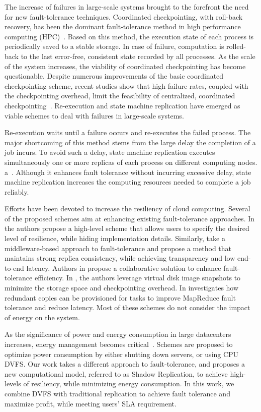 
\noindent 
The increase of failures in large-scale systems 
brought to the forefront the need for new fault-tolerance techniques. 
Coordinated checkpointing, with roll-back recovery, has been the dominant
fault-tolerance method in high performance computing (HPC)~\cite{Agarwal04adaptiveincremental,781058,Daly2006303,632814}. 
Based on this method, the execution state of each process is 
periodically saved to a stable storage. In case of failure, computation is 
rolled-back to the last error-free, consistent state recorded by all processes. 
As the scale of the system increases, the viability of coordinated checkpointing has become questionable. 
Despite numerous improvements of the basic coordinated checkpointing scheme, 
recent studies show that high failure rates, coupled with the checkpointing
overhead, limit the feasibility of 
centralized, coordinated checkpointing~\cite{Diouri2012}. 
Re-execution and state machine replication have emerged 
as viable schemes to deal with failures in large-scale systems. 

Re-execution waits until a failure occurs and re-executes the failed process. 
The major shortcoming of this method stems from the large 
delay the completion of a job incurs. To avoid such a delay, state machine replication executes simultaneously one or more replicas of each process on different computing nodes.
a~\cite{Ferreira2011,Sousa2005}. Although it enhances fault tolerance without incurring excessive delay,
state machine replication increases the
computing resources needed to complete a job reliably. 

Efforts have been devoted to increase the resiliency of cloud computing. Several of the proposed schemes aim at
enhancing existing fault-tolerance approaches.  In \cite{jhawar_systems_2013} the authors propose a
high-level scheme that allows users to specify the desired
level of resilience, while hiding implementation details. Similarly, \cite{Zhao2010} take a middleware-based
approach to fault-tolerance and propose a method that maintains strong replica consistency, while achieving transparency
and low end-to-end latency. Authors in \cite{tchana_cits_2012} 
propose a collaborative solution to enhance fault-tolerance efficiency.  
In \cite{Nicolae2011}, the authors leverage
virtual disk image snapshots to minimize the storage space and
checkpointing overhead. In \cite{Zheng2010}
investigates how redundant copies can be provisioned for tasks to
improve MapReduce fault tolerance and reduce latency. Most 
of these schemes do not consider the impact of energy on the system. 

As the significance of power and energy consumption in large 
datacenters increases, energy management becomes
critical~\cite{chen_2012_srds,Lin2011}. Schemes are proposed to optimize power consumption by either
shutting down servers, or using CPU DVFS. Our work takes a different approach to fault-tolerance, and proposes 
a new computational model, referred to as Shadow Replication, to achieve
high-levels of resiliency, while minimizing energy consumption. In this work, we combine DVFS with traditional replication to achieve fault tolerance and maximize profit, while meeting users' SLA requirement.
